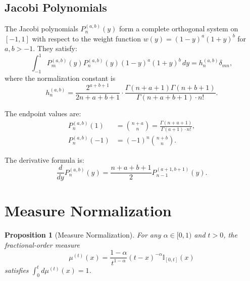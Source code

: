 \documentclass{article}
\theoremstyle{plain}
\newtheorem{proposition}[theorem]{Proposition}
\theoremstyle{definition}
\theoremstyle{remark}
\begin{document}
\subsection{Jacobi Polynomials}

The Jacobi polynomials $P_n^{(a,b)}(y)$ form a complete orthogonal system on $[-1, 1]$ with respect to the weight function $w(y) = (1-y)^a (1+y)^b$ for $a, b > -1$. They satisfy:
\begin{equation}
	\int_{-1}^{1} P_m^{(a,b)}(y) P_n^{(a,b)}(y) (1-y)^a (1+y)^b \, dy = h_n^{(a,b)} \delta_{mn},
	\label{eq:jacobi_orthogonality}
\end{equation}
where the normalization constant is
\begin{equation}
	h_n^{(a,b)} = \frac{2^{a+b+1}}{2n+a+b+1} \cdot \frac{\Gamma(n+a+1)\Gamma(n+b+1)}{\Gamma(n+a+b+1) \cdot n!}.
	\label{eq:jacobi_normalization}
\end{equation}

The endpoint values are:
\begin{align}
	P_n^{(a,b)}(1) &= \binom{n+a}{n} = \frac{\Gamma(n+a+1)}{\Gamma(a+1) \cdot n!}, \label{eq:jacobi_endpoint_1} \\
	P_n^{(a,b)}(-1) &= (-1)^n \binom{n+b}{n}. \label{eq:jacobi_endpoint_minus1}
\end{align}

The derivative formula is:
\begin{equation}
	\frac{d}{dy} P_n^{(a,b)}(y) = \frac{n + a + b + 1}{2} P_{n-1}^{(a+1, b+1)}(y).
	\label{eq:jacobi_derivative}
\end{equation}

\section{Measure Normalization}
\label{app:normalization}

\begin{proposition}[Measure Normalization]
	\label{prop:normalization}
	For any $\alpha \in [0, 1)$ and $t > 0$, the fractional-order measure
	\begin{equation}
		\mu^{(t)}(x) = \frac{1-\alpha}{t^{1-\alpha}} (t - x)^{-\alpha} \mathbb{I}_{[0, t]}(x)
	\end{equation}
	satisfies $\int_0^t d\mu^{(t)}(x) = 1$.
\end{proposition}
\end{document}
